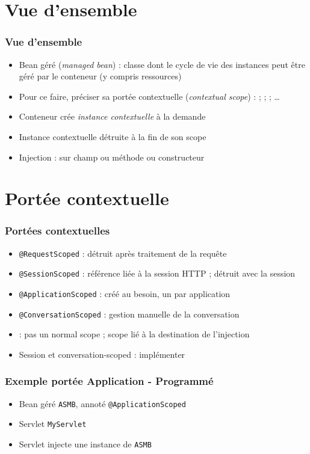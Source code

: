 \documentclass[english, french]{beamer}
\begin{document}
\section{Vue d’ensemble}
\begin{frame}
	\frametitle{Vue d’ensemble}
	\begin{itemize}
		\item Bean géré (\emph{managed bean}) : classe dont le cycle de vie des instances peut être géré par le conteneur (y compris ressources)
		\item Pour ce faire, préciser sa portée contextuelle (\emph{contextual scope}) :  ;  ;  ; …
		\item Conteneur crée \emph{instance contextuelle} à la demande
		\item Instance contextuelle détruite à la fin de son scope
		\item Injection :  sur champ {\tiny ou méthode ou constructeur}
	\end{itemize}
\end{frame}

\section{Portée contextuelle}
\begin{frame}
	\frametitle{Portées contextuelles}
	\begin{itemize}
		\item \texttt{@RequestScoped} : détruit après traitement de la requête
		\item \texttt{@SessionScoped} : référence liée à la session HTTP ; détruit avec la session
		\item \texttt{@ApplicationScoped} : créé au besoin, un par application
		\item \texttt{@ConversationScoped} : gestion manuelle de la conversation
		\item {} : pas un normal scope ; scope lié à la destination de l’injection
		\item Session et conversation-scoped : implémenter 
	\end{itemize}
\end{frame}

\begin{frame}
	\frametitle{Exemple portée Application - Programmé}
	\begin{itemize}
		\item Bean géré \texttt{ASMB}, annoté \texttt{@ApplicationScoped}
		\item Servlet \texttt{MyServlet}
		\item Servlet injecte une instance de \texttt{ASMB}
	\end{itemize}
\end{frame}
\end{document}

